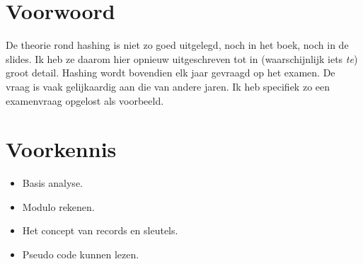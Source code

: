 \documentclass[hashing.tex]{subfiles}
\begin{document}
\section*{Voorwoord}
De theorie rond hashing is niet zo goed uitgelegd, noch in het boek, noch in de slides. Ik heb ze daarom hier opnieuw uitgeschreven tot in  (waarschijnlijk iets \emph{te}) groot detail.
Hashing wordt bovendien elk jaar gevraagd op het examen. De vraag is vaak gelijkaardig aan die van andere jaren. Ik heb specifiek zo een examenvraag opgelost als voorbeeld.

\section*{Voorkennis}
\begin{itemize}
\item Basis analyse.
\item Modulo rekenen.
\item Het concept van records en sleutels.
\item Pseudo code kunnen lezen.
\end{itemize}
\end{document}
